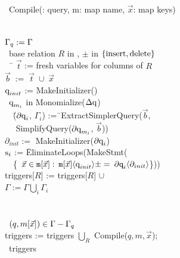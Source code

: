 \vspace{-1mm}
\begin{tabbing}
\alg\ Compile(\q: query, m: map name, $\vec{x}$: map keys) \\
\\
 \\
$\Gamma_{q} := \Gamma$\\
\algforeach\ base relation $R$ in \q,
               $\pm$ in $\{\mbox{insert},\mbox{delete}\}$
\algdo \\
~~\= $\vec{t}$ := fresh variables for columns of $R$
     \\
  \> $\vec{b} \; := \; \vec{t} \; \cup \; \vec{x}$
     $\qquad \qquad \qquad \qquad \qquad$ \\
  \> $\mbox{q}_{init}$ := MakeInitializer(\q)\\
  \> \algforeach\ $\mbox{q}_{m_i}$ in Monomialize($\Delta\mbox{q}$) \algdo\\
\>~~\= ($\partial\mbox{q}_i$, $\Gamma_i$) :=\=\ ExtractSimplerQuery($\vec{b}$,\\
  \>\>\> ~~ SimplifyQuery($\partial\mbox{q}_{m_i}$, $\vec{b}$))\\
  \>\> $\partial_{init} := $ MakeInitializer($\partial\mbox{q} _i$)\\
  \>\> $\mbox{s}_i$ := \= EliminateLoops(MakeStmt(\\
  \>\>\> ~~\{\codeforeach\ $\vec{x} \in \codev{m} [\vec{x}]:$
  $\codev{m} [\vec{x}]\tuple{\v{\q}_{init}} \pm = $
  $\partial\codev{q} _{i}\tuple{\partial_{init}}$\}))\\
  \>\> triggers[$R$] := triggers[$R$] $\cup$ \\
  \>\> $\Gamma := \Gamma \bigcup_i \Gamma_i$
  \ \ \ \ \\
  \>\algdone\\
\algdone\\
\algforeach\ $(q, m[\vec{x}]) \in \Gamma - \Gamma_{q}$ \algdo\\
  \> triggers := triggers $\bigcup_{R}$ Compile($q, m, \vec{x}$); \\
\comment{\algdone\\}
\algreturn\ triggers
\end{tabbing}


